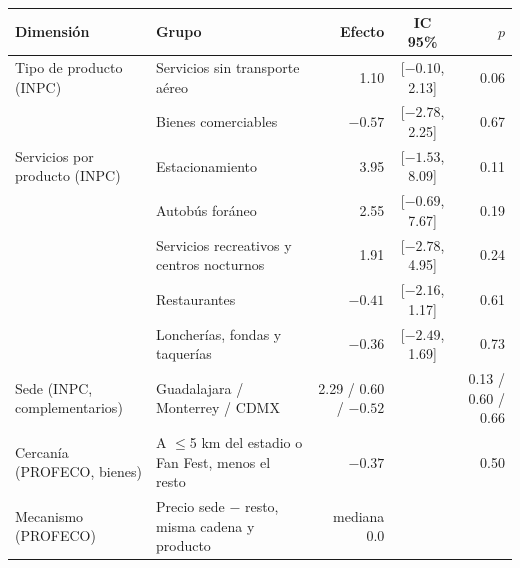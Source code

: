 \begin{tabular}{@{}llrcr@{}}
\toprule
Dimensión & Grupo & Efecto & IC 95\% & $p$ \\
\midrule
Tipo de producto (INPC) & Servicios sin transporte aéreo & 1.10 & [$-0.10$, 2.13] & 0.06 \\
 & Bienes comerciables & $-0.57$ & [$-2.78$, 2.25] & 0.67 \\
Servicios por producto (INPC) & Estacionamiento & 3.95 & [$-1.53$, 8.09] & 0.11 \\
 & Autobús foráneo & 2.55 & [$-0.69$, 7.67] & 0.19 \\
 & Servicios recreativos y centros nocturnos & 1.91 & [$-2.78$, 4.95] & 0.24 \\
 & Restaurantes & $-0.41$ & [$-2.16$, 1.17] & 0.61 \\
 & Loncherías, fondas y taquerías & $-0.36$ & [$-2.49$, 1.69] & 0.73 \\
Sede (INPC, complementarios) & Guadalajara / Monterrey / CDMX & 2.29 / 0.60 / $-0.52$ &  & 0.13 / 0.60 / 0.66 \\
Cercanía (PROFECO, bienes) & A $\le$5 km del estadio o Fan Fest, menos el resto & $-0.37$ &  & 0.50 \\
Mecanismo (PROFECO) & Precio sede $-$ resto, misma cadena y producto & mediana 0.0 &  &  \\
\bottomrule
\end{tabular}
